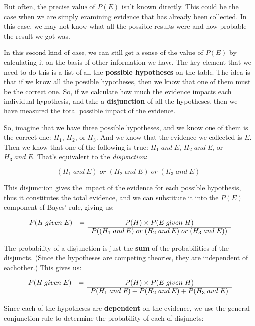 \documentclass[letterpaper,10pt]{article}
\begin{document}
But often, the precise value of $P(E)$ isn't known directly.  This could be the case when we are simply examining evidence that has already been collected.  In this case, we may not know what all the possible results were and how probable the result we got was.

In this second kind of case, we can still get a sense of the value of $P(E)$ by calculating it on the basis of other information we have.  The key element that we need to do this is a list of all the \textbf{possible hypotheses} on the table.  The idea is that if we know all the possible hypotheses, then we know that one of them must be the correct one.  So, if we calculate how much the evidence impacts each individual hypothesis, and take a \textbf{disjunction} of all the hypotheses, then we have measured the total possible impact of the evidence.

So, imagine that we have three possible hypotheses, and we know one of them is the correct one: $H_1$, $H_2$, or $H_3$. And we know that the evidence we collected is $E$.  Then we know that one of the following is true: $H_1\;and\; E$, $H_2\; and\; E$, or $H_3\; and\; E$. That's equivalent to the \textit{disjunction}:

\[(H_1\;and\; E)\; or\; (H_2\; and\; E)\; or\; (H_3\; and\; E)\]

This disjunction gives the impact of the evidence for each possible hypothesis, thus it constitutes the total evidence, and we can substitute it into the $P(E)$ component of Bayes' rule, giving us:

\[\begin{array}{ccc}
P(H\; given\; E) & = & P(H) \times P(E\; given\; H) \\ \cline{3-3}
 & & P((H_1\;and\; E)\; or\; (H_2\; and\; E)\; or\; (H_3\; and\; E)) \\
  \end{array}\]

The probability of a disjunction is just the \textbf{sum} of the probabilities of the disjuncts. (Since the hypotheses are competing theories, they are independent of eachother.) This gives us:

\[\begin{array}{ccc}
P(H\; given\; E) & = & P(H) \times P(E\; given\; H) \\ \cline{3-3}
 & & P(H_1\;and\; E)+ P(H_2\; and\; E)+ P(H_3\; and\; E) \\
  \end{array}\]

Since each of the hypotheses are \textbf{dependent} on the evidence, we use the general conjunction rule to determine the probability of each of disjuncts:
\end{document}
